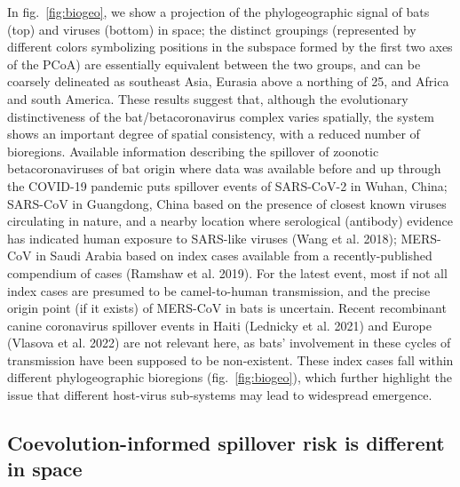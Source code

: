 \documentclass[11pt]{article}
\begin{document}
In fig.~\ref{fig:biogeo}, we show a projection of the phylogeographic
signal of bats (top) and viruses (bottom) in space; the distinct
groupings (represented by different colors symbolizing positions in the
subspace formed by the first two axes of the PCoA) are essentially
equivalent between the two groups, and can be coarsely delineated as
southeast Asia, Eurasia above a northing of 25, and Africa and south
America. These results suggest that, although the evolutionary
distinctiveness of the bat/betacoronavirus complex varies spatially, the
system shows an important degree of spatial consistency, with a reduced
number of bioregions. Available information describing the spillover of
zoonotic betacoronaviruses of bat origin where data was available before
and up through the COVID-19 pandemic puts spillover events of SARS-CoV-2
in Wuhan, China; SARS-CoV in Guangdong, China based on the presence of
closest known viruses circulating in nature, and a nearby location where
serological (antibody) evidence has indicated human exposure to
SARS-like viruses (Wang et al. 2018); MERS-CoV in Saudi Arabia based on
index cases available from a recently-published compendium of cases
(Ramshaw et al. 2019). For the latest event, most if not all index cases
are presumed to be camel-to-human transmission, and the precise origin
point (if it exists) of MERS-CoV in bats is uncertain. Recent
recombinant canine coronavirus spillover events in Haiti (Lednicky et
al. 2021) and Europe (Vlasova et al. 2022) are not relevant here, as
bats' involvement in these cycles of transmission have been supposed to
be non-existent. These index cases fall within different phylogeographic
bioregions (fig.~\ref{fig:biogeo}), which further highlight the issue
that different host-virus sub-systems may lead to widespread emergence.

\hypertarget{coevolution-informed-spillover-risk-is-different-in-space}{%
\subsection{Coevolution-informed spillover risk is different in
space}\label{coevolution-informed-spillover-risk-is-different-in-space}}
\end{document}
